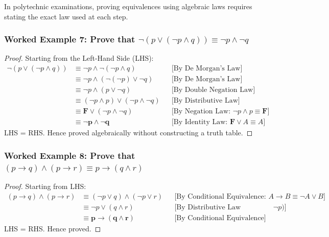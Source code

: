 \documentclass[11pt,a4paper]{article}
\begin{document}
In polytechnic examinations, proving equivalences using algebraic laws requires stating the exact law used at each step.

\subsubsection*{Worked Example 7: Prove that $\neg(p \lor (\neg p \land q)) \equiv \neg p \land \neg q$}

\begin{proof}
Starting from the Left-Hand Side (LHS):
\begin{align*}
\neg(p \lor (\neg p \land q)) &\equiv \neg p \land \neg(\neg p \land q) && \text{[By De Morgan's Law]} \\
&\equiv \neg p \land (\neg(\neg p) \lor \neg q) && \text{[By De Morgan's Law]} \\
&\equiv \neg p \land (p \lor \neg q) && \text{[By Double Negation Law]} \\
&\equiv (\neg p \land p) \lor (\neg p \land \neg q) && \text{[By Distributive Law]} \\
&\equiv \mathbf{F} \lor (\neg p \land \neg q) && \text{[By Negation Law: $\neg p \land p \equiv \mathbf{F}$]} \\
&\equiv \mathbf{\neg p \land \neg q} && \text{[By Identity Law: $\mathbf{F} \lor A \equiv A$]}
\end{align*}
LHS = RHS. Hence proved algebraically without constructing a truth table.
\end{proof}

\subsubsection*{Worked Example 8: Prove that $(p \rightarrow q) \land (p \rightarrow r) \equiv p \rightarrow (q \land r)$}

\begin{proof}
Starting from LHS:
\begin{align*}
(p \rightarrow q) \land (p \rightarrow r) &\equiv (\neg p \lor q) \land (\neg p \lor r) && \text{[By Conditional Equivalence: $A \rightarrow B \equiv \neg A \lor B$]} \\
&\equiv \neg p \lor (q \land r) && \text{[By Distributive Law (factoring out $\neg p$)]} \\
&\equiv \mathbf{p \rightarrow (q \land r)} && \text{[By Conditional Equivalence]}
\end{align*}
LHS = RHS. Hence proved.
\end{proof}
\end{document}
